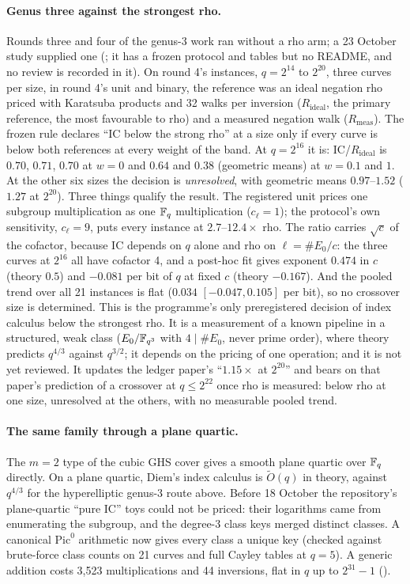 \paragraph{Genus three against the strongest rho.} Rounds three and four
of the genus-3 work ran without a rho arm; a 23 October study supplied one
(; it has a frozen protocol and tables
but no README, and no review is recorded in it). On round 4's instances,
$q=2^{14}$ to $2^{20}$, three curves per size, in round 4's unit and binary,
the reference was an ideal negation rho priced with Karatsuba products and
32 walks per inversion ($R_{\mathrm{ideal}}$, the primary reference, the
most favourable to rho) and a measured negation walk ($R_{\mathrm{meas}}$).
The frozen rule declares ``IC below the strong rho'' at a size only if every
curve is below both references at every weight of the band. At $q=2^{16}$
it is: IC/$R_{\mathrm{ideal}}$ is $0.70$, $0.71$, $0.70$ at $w=0$ and $0.64$
and $0.38$ (geometric means) at $w=0.1$ and $1$. At the other six sizes the
decision is \emph{unresolved}, with geometric means $0.97$--$1.52$ ($1.27$ at
$2^{20}$). Three things qualify the result. The registered unit prices one
subgroup multiplication as one $\mathbb{F}_q$ multiplication ($c_\ell=1$); the
protocol's own sensitivity, $c_\ell=9$, puts every instance at $2.7$--$12.4\times$
rho. The ratio carries $\sqrt c$ of the cofactor, because IC depends on $q$
alone and rho on $\ell=\#E_0/c$: the three curves at $2^{16}$ all have
cofactor 4, and a post-hoc fit gives exponent $0.474$ in $c$ (theory $0.5$)
and $-0.081$ per bit of $q$ at fixed $c$ (theory $-0.167$). And the pooled
trend over all 21 instances is flat ($0.034$ $[-0.047,0.105]$ per bit), so
no crossover size is determined. This is the programme's only
preregistered decision of index calculus below the strongest rho. It is a
measurement of a known pipeline in a structured, weak class
($E_0/\mathbb{F}_{q^3}$ with $4\mid\#E_0$, never prime order), where theory
predicts $q^{4/3}$ against $q^{3/2}$; it depends on the pricing of one
operation; and it is not yet reviewed. It updates the ledger paper's
``$1.15\times$ at $2^{20}$'' and bears on that paper's prediction of a
crossover at $q\le2^{22}$ once rho is measured: below rho at one size,
unresolved at the others, with no measurable pooled trend.

\paragraph{The same family through a plane quartic.} The $m=2$ type of the
cubic GHS cover gives a smooth plane quartic over $\mathbb{F}_q$ directly. On a
plane quartic, Diem's index calculus is $\tilde O(q)$ in theory, against
$q^{4/3}$ for the hyperelliptic genus-3 route above. Before 18 October the
repository's plane-quartic ``pure IC'' toys could not be priced: their
logarithms came from enumerating the subgroup, and the degree-3 class keys
merged distinct classes. A canonical $\mathrm{Pic}^0$ arithmetic now gives
every class a unique key (checked against brute-force class counts on 21
curves and full Cayley tables at $q=5$). A generic addition costs 3{,}523
multiplications and 44 inversions, flat in $q$ up to $2^{31}-1$
().


